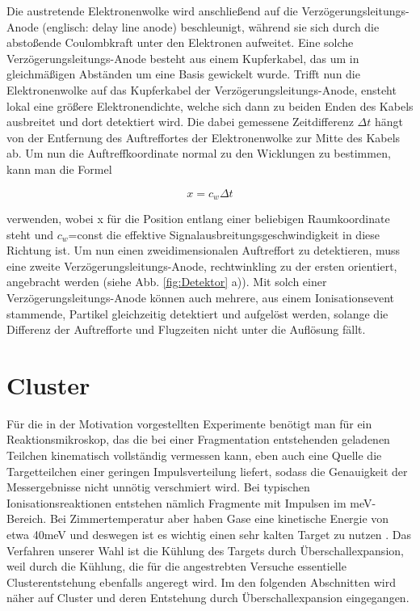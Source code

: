 Die austretende Elektronenwolke wird anschließend auf die Verzögerungsleitungs-Anode (englisch: delay line anode) beschleunigt, während sie sich durch die abstoßende Coulombkraft unter den Elektronen aufweitet. Eine solche Verzögerungsleitungs-Anode besteht aus einem Kupferkabel, das um in gleichmäßigen Abständen um eine Basis gewickelt wurde. Trifft nun die Elektronenwolke auf das Kupferkabel der Verzögerungsleitungs-Anode, ensteht lokal eine größere Elektronendichte, welche sich dann zu beiden Enden des Kabels ausbreitet und dort detektiert wird. Die dabei gemessene Zeitdifferenz $\Delta t$ hängt von der Entfernung des Auftreffortes der Elektronenwolke zur Mitte des Kabels ab. Um nun die Auftreffkoordinate normal zu den Wicklungen zu bestimmen, kann man die Formel

\begin{equation}
x = c_w \Delta t
\end{equation}

verwenden, wobei x für die Position entlang einer beliebigen Raumkoordinate steht und $c_w$=const die effektive Signalausbreitungsgeschwindigkeit in diese Richtung ist. Um nun einen zweidimensionalen Auftreffort zu detektieren, muss eine zweite Verzögerungsleitungs-Anode, rechtwinkling zu der ersten orientiert, angebracht werden (siehe Abb. \ref{fig:Detektor} a)). Mit solch einer Verzögerungsleitungs-Anode können auch mehrere, aus einem Ionisationsevent stammende, Partikel gleichzeitig detektiert und aufgelöst werden, solange die Differenz der Auftrefforte und Flugzeiten nicht unter die Auflösung fällt.


\newpage
\section{Cluster}

Für die in der Motivation vorgestellten Experimente benötigt man für ein Reaktionsmikroskop, das die bei einer Fragmentation entstehenden geladenen Teilchen kinematisch vollständig vermessen kann, eben auch eine Quelle die Targetteilchen einer geringen Impulsverteilung liefert, sodass die Genauigkeit der Messergebnisse nicht unnötig verschmiert wird. Bei typischen Ionisationsreaktionen entstehen nämlich Fragmente mit Impulsen im meV-Bereich. Bei Zimmertemperatur aber haben Gase eine kinetische Energie von etwa 40meV und deswegen ist es wichtig einen sehr kalten Target zu nutzen \cite{kurka07}. Das Verfahren unserer Wahl ist die Kühlung des Targets durch Überschallexpansion, weil durch die Kühlung, die für die angestrebten Versuche essentielle Clusterentstehung ebenfalls angeregt wird. Im den folgenden Abschnitten wird näher auf Cluster und deren Entstehung durch Überschallexpansion eingegangen.


